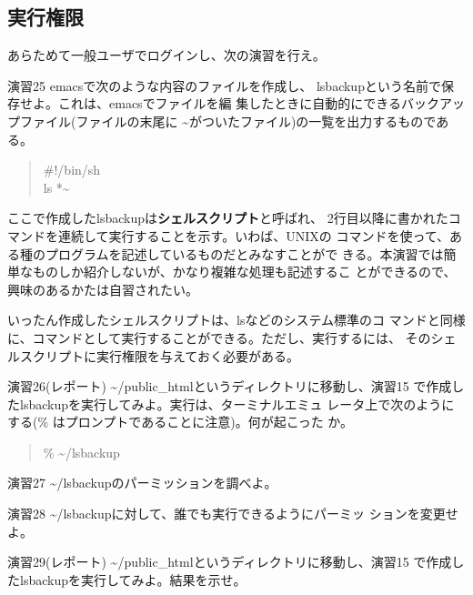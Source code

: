 \documentclass[a4j,10pt]{jarticle}
\begin{document}
\subsection{実行権限}
あらためて一般ユーザでログインし、次の演習を行え。
\begin{itembox}{演習25}
 {\sffamily emacs}で次のような内容のファイルを作成し、{\sffamily
 lsbackup}という名前で保存せよ。これは、{\sffamily emacs}でファイルを編
 集したときに自動的にできるバックアップファイル(ファイルの末尾に
 {\sffamily \~{}}がついたファイル)の一覧を出力するものである。
 \begin{quote}
  {\sffamily \#!/bin/sh}\\
  {\sffamily ls *\~{}}
 \end{quote}
\end{itembox}

ここで作成した{\sffamily lsbackup}は{\bfseries シェルスクリプト}と呼ばれ、
2行目以降に書かれたコマンドを連続して実行することを示す。いわば、UNIXの
コマンドを使って、ある種のプログラムを記述しているものだとみなすことがで
きる。本演習では簡単なものしか紹介しないが、かなり複雑な処理も記述するこ
とができるので、興味のあるかたは自習されたい。

いったん作成したシェルスクリプトは、{\sffamily ls}などのシステム標準のコ
マンドと同様に、コマンドとして実行することができる。ただし、実行するには、
そのシェルスクリプトに実行権限を与えておく必要がある。

\begin{itembox}{演習26(レポート)}
 {\sffamily \~{}{\slash}public\_html}というディレクトリに移動し、演習15 
 で作成した{\sffamily lsbackup}を実行してみよ。実行は、ターミナルエミュ
 レータ上で次のようにする(\% はプロンプトであることに注意)。何が起こった
 か。
 \begin{quote}
  {\sffamily \% \~{}{\slash}lsbackup}
 \end{quote}
\end{itembox}
\begin{itembox}{演習27}
 {\sffamily \~{}{\slash}lsbackup}のパーミッションを調べよ。
\end{itembox}
\begin{itembox}{演習28}
 {\sffamily \~{}{\slash}lsbackup}に対して、誰でも実行できるようにパーミッ
 ションを変更せよ。
\end{itembox}
\begin{itembox}{演習29(レポート)}
 {\sffamily \~{}{\slash}public\_html}というディレクトリに移動し、演習15 
 で作成した{\sffamily lsbackup}を実行してみよ。結果を示せ。
\end{itembox}
\end{document}

